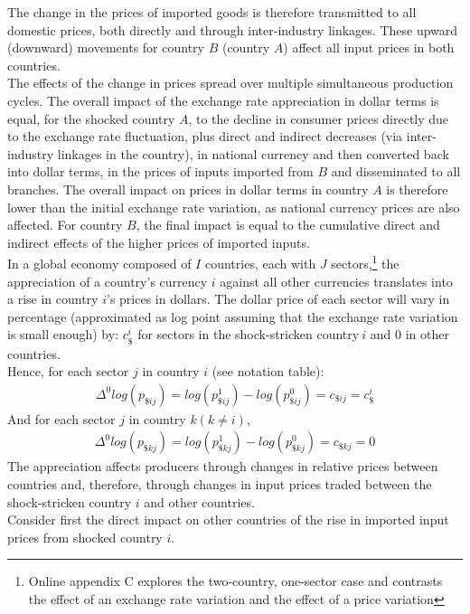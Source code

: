\documentclass[11pt,a4paper]{paper} %
\begin{document}
The change in the prices of imported goods is therefore transmitted to all domestic prices, both directly and through inter-industry linkages. 
These upward (downward) movements for country $B$ (country $A$) affect all input prices in both countries.\\
The effects of the change in prices spread over multiple simultaneous production cycles. 
The overall impact of the exchange rate appreciation in dollar terms is equal, for the shocked country $A$, to the decline in consumer prices directly due to the exchange rate fluctuation, plus direct and indirect decreases (via inter-industry linkages in the country), in national currency and then converted back into dollar terms, in the prices of inputs imported from $B$ and disseminated to all branches. 
The overall impact on prices in dollar terms in country $A$ is therefore lower than the initial exchange rate variation, as national currency prices are also affected. 
For country $B$, the final impact is equal to the cumulative direct and indirect effects of the higher prices of imported inputs.\\
In a global economy composed of $I$ countries, each with $J$ sectors,\footnote{Online appendix C explores the two-country, one-sector case and contrasts the effect of an exchange rate variation and the effect of a price variation} the appreciation of a country's currency $i$ against all other currencies translates into a rise in country $i$'s prices in dollars. The dollar price of each sector will vary in percentage (approximated as log point assuming that the exchange rate variation is small enough) by: $c_\$^i$ for sectors in the shock-stricken country$~i$ and 0 in other countries. \\
Hence, for each sector $j$ in country $i$ (see notation table):
\begin{eqnarray*}
 {{\Delta }^{0}}log(p_{\${ij}})=log(p_{\${ij}}^{1})-log(p_{\${ij}}^{0})=c_{\${ij}}=c_{\$}^i
  \end{eqnarray*}	
And for each sector $j$ in country $k (k\ne i)$,
\begin{eqnarray*}
 {{\Delta }^{0}}log(p_{\${kj}})=log(p_{\${kj}}^{1})-log(p_{\${kj}}^{0})=c_{\${kj}}=0
 \end{eqnarray*}	
The appreciation affects producers through changes in relative prices between countries and, therefore, through changes in input prices traded between the shock-stricken country $i$ and other countries. \\
Consider first the direct impact on other countries of the rise in imported input prices from shocked country $i$. 
\end{document}
